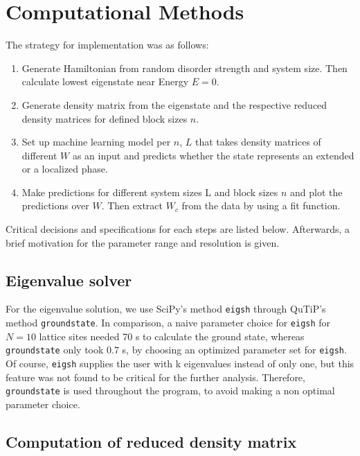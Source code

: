 \documentclass[reprint,amsmath,amssymb,aps,prb]{revtex4-2}
\begin{document}
\section{Computational Methods}

The strategy for implementation was as follows:

\begin{enumerate}
	\item Generate Hamiltonian from random disorder strength and system size. Then calculate lowest eigenstate near Energy $E = 0$.
	\item Generate density matrix from the eigenstate and the respective reduced density matrices for defined block sizes $n$.
	\item  Set up machine learning model per $n$, $L$ that takes density matrices of different $W$ as an input and predicts whether the state represents an extended or a localized phase.
	\item Make predictions for different system sizes L and block sizes $n$ and plot the predictions over $W$. Then extract $W_c$	from the data by using a fit function.
\end{enumerate}

Critical decisions and specifications for each steps are listed below. Afterwards, a brief motivation for the parameter range and resolution is given.

\subsection{Eigenvalue solver}

For the eigenvalue solution, we use SciPy's method \texttt{eigsh} through QuTiP's method \texttt{groundstate}\cite{Virtanen_2020, Johansson2012}. In comparison, a naive parameter choice for \texttt{eigsh} for $N=10$ lattice sites needed 70 s to calculate the ground state, whereas \texttt{groundstate} only took 0.7 s, by choosing an optimized parameter set for \texttt{eigsh}. Of course, \texttt{eigsh} supplies the user with k eigenvalues instead of only one, but this feature was not found to be critical for the further analysis. Therefore, \texttt{groundstate} is used throughout the program, to avoid making a non optimal parameter choice.

\subsection{Computation of reduced density matrix}
\end{document}
